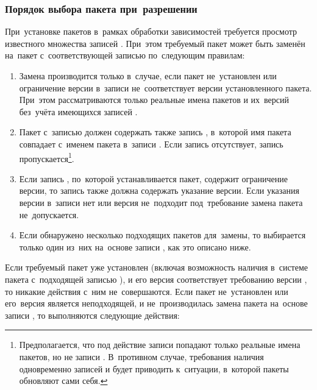 \subsubsection{Порядок выбора пакета при~разрешении }

При~установке пакетов в~рамках обработки зависимостей требуется  просмотр известного множества записей .
При~этом требуемый пакет может быть заменён на~пакет с~соответствующей записью  по~следующим правилам:

\begin{enumerate}

\item {
Замена производится только в~случае, если пакет не~установлен или ограничение версии в~записи  не~соответствует версии установленного пакета.
При~этом рассматриваются только реальные имена пакетов и их~версий без~учёта имеющихся записей .
}

\item {
Пакет с~записью  должен содержать также запись ,
в~которой имя пакета совпадает с~именем пакета в~записи .
Если запись  отсутствует, запись  пропускается\footnote 
{
Предполагается, что под действие записи  попадают только реальные имена пакетов, но не записи . 
В~противном случае, требования наличия одновременно записей  и  будет приводить к~ситуации, в~которой пакеты обновляют сами себя.
}.
}

\item {
Если запись , по~которой устанавливается пакет, содержит ограничение версии,
то запись  также должна содержать указание версии.
Если указания версии в~записи  нет или версия не~подходит под~требование  замена пакета не~допускается.
}

\item {
Если обнаружено несколько подходящих пакетов для~замены, то выбирается только один из~них на~основе записи ,
как это описано ниже. 
}

\end{enumerate}

Если требуемый пакет уже установлен  (включая возможность наличия в~системе пакета с~подходящей записью ), и его версия соответствует требованию версии ,
то никакие действия с~ним не~совершаются.
Если пакет не~установлен или его~версия является неподходящей, и не~производилась замена пакета на~основе записи ,
то выполняются следующие действия:

